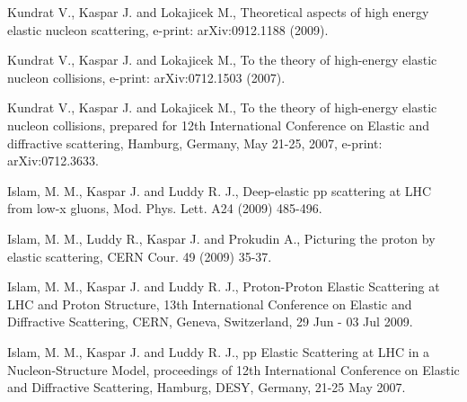 \> Kundrat V., Kaspar J. and Lokajicek M., Theoretical aspects of high energy elastic nucleon scattering, e-print: arXiv:0912.1188 (2009).

\> Kundrat V., Kaspar J. and Lokajicek M., To the theory of high-energy elastic nucleon collisions, e-print: arXiv:0712.1503 (2007).

\> Kundrat V., Kaspar J. and Lokajicek M., To the theory of high-energy elastic nucleon collisions, prepared for 12th International Conference on Elastic and diffractive scattering, Hamburg, Germany, May 21-25, 2007, e-print: arXiv:0712.3633.


\> Islam, M. M., Kaspar J. and Luddy R. J., Deep-elastic pp scattering at LHC from low-x gluons, Mod. Phys. Lett. A24 (2009) 485-496.

\> Islam, M. M., Luddy R., Kaspar J. and Prokudin A., Picturing the proton by elastic scattering, CERN Cour. 49 (2009) 35-37.
	
\> Islam, M. M., Kaspar J. and Luddy R. J., Proton-Proton Elastic Scattering at LHC and Proton Structure, 13th International Conference on Elastic and Diffractive Scattering, CERN, Geneva, Switzerland, 29 Jun - 03 Jul 2009.

\> Islam, M. M., Kaspar J. and Luddy R. J., pp Elastic Scattering at LHC in a Nucleon-Structure Model, proceedings of 12th International Conference on Elastic and Diffractive Scattering, Hamburg, DESY, Germany, 21-25 May 2007.

\bye
